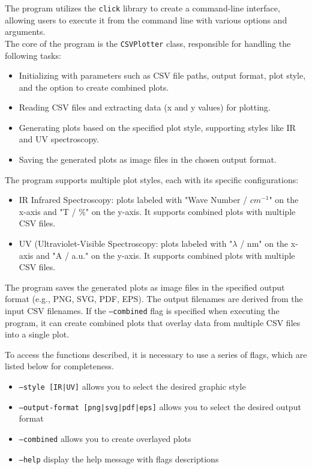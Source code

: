 \documentclass[../Master.tex]{subfiles}
\begin{document}
The program utilizes the \texttt{click} library to create a command-line interface, allowing users to execute it from the command line with various options and arguments.\\
The core of the program is the \texttt{CSVPlotter} class, responsible for handling the following tasks:
\begin{itemize}
	\item Initializing with parameters such as CSV file paths, output format, plot style, and the option to create combined plots.
	\item Reading CSV files and extracting data (x and y values) for plotting.
	\item Generating plots based on the specified plot style, supporting styles like IR and UV spectroscopy.
	\item Saving the generated plots as image files in the chosen output format.
\end{itemize}
The program supports multiple plot styles, each with its specific configurations:
\begin{itemize}
	\item IR Infrared Spectroscopy: plots labeled with "Wave Number / $cm^{-1}$" on the x-axis and "T / \%" on the y-axis. It supports combined plots with multiple CSV files.
	\item UV (Ultraviolet-Visible Spectroscopy: plots labeled with "$\lambda$ / nm" on the x-axis and "A / a.u." on the y-axis. It supports combined plots with multiple CSV files.
\end{itemize}
The program saves the generated plots as image files in the specified output format (e.g., PNG, SVG, PDF, EPS). The output filenames are derived from the input CSV filenames.
If the \texttt{--combined} flag is specified when executing the program, it can create combined plots that overlay data from multiple CSV files into a single plot.

To access the functions described, it is necessary to use a series of flags, which are listed below for completeness.

\begin{itemize}
	\item \texttt{--style [IR|UV]} allows you to select the desired graphic style
	\item \texttt{--output-format [png|svg|pdf|eps]} allows you to select the desired output format
	\item \texttt{--combined} allows you to create overlayed plots
	\item \texttt{--help} display the help message with flags descriptions
\end{itemize}
\end{document}
